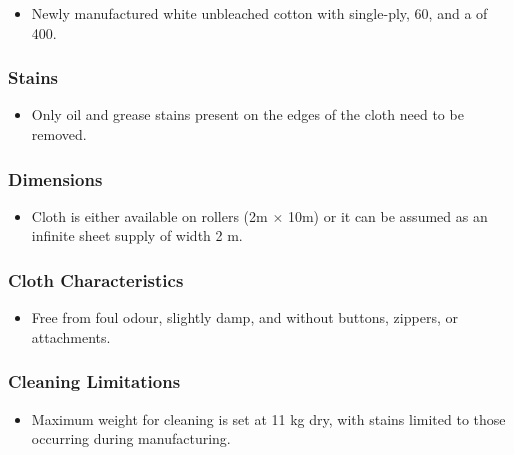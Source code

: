 \documentclass[table,french,english]{rapportCS}
\begin{document}
    \begin{itemize}[label=$\bullet$]
        \item Newly manufactured white unbleached cotton with single-ply,   60, and a  of 400.
      
    \end{itemize}
\subsubsection{Stains}\label{sec:matspec}
    \begin{itemize}[label=$\bullet$]
      \item Only oil and grease stains present on the edges of the cloth need to be removed.

    \end{itemize}
  
  \subsubsection{Dimensions}\label{sec:dimensions}
    \begin{itemize}[label=$\bullet$]
      \item Cloth is either available on rollers (2m $\times$ 10m) or it can be assumed as an infinite sheet supply of width 2 m.

    \end{itemize}
  
  \subsubsection{Cloth Characteristics}\label{sec:clothchar}
    \begin{itemize}[label=$\bullet$]
      \item Free from foul odour, slightly damp, and without buttons, zippers, or attachments.
    \end{itemize}

  \subsubsection{Cleaning Limitations}\label{sec:cleanlim}
    \begin{itemize}[label=$\bullet$]
      \item Maximum weight for cleaning is set at 11 kg dry, with stains limited to those occurring during manufacturing.
    \end{itemize}
\end{document}

